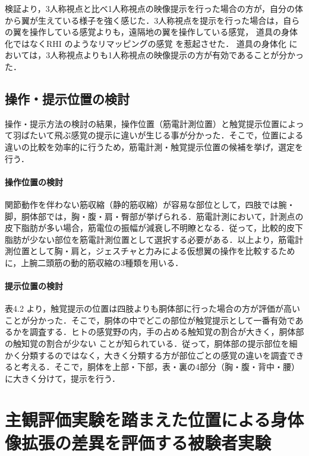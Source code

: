 \begin{small}
      検証より，3人称視点と比べ1人称視点の映像提示を行った場合の方が，自分の体から翼が生えている様子を強く感じた．3人称視点を提示を行った場合は，自らの翼を操作している感覚よりも，遠隔地の翼を操作している感覚，
      道具の身体化ではなくRHI
      のようなリマッピングの感覚
      を惹起させた．
      道具の身体化
      においては，3人称視点よりも1人称視点の映像提示の方が有効であることが分かった．
  
  \subsection{操作・提示位置の検討}
    操作・提示方法の検討の結果，操作位置（筋電計測位置）と触覚提示位置によって羽ばたいて飛ぶ感覚の提示に違いが生じる事が分かった．そこで，位置による違いの比較を効率的に行うため，筋電計測・触覚提示位置の候補を挙げ，選定を行う．
  
    \paragraph{操作位置の検討} %
      関節動作を伴わない筋収縮（静的筋収縮）が容易な部位として，四肢では腕・脚，胴体部では，胸・腹・肩・臀部が挙げられる．筋電計測において，計測点の皮下脂肪が多い場合，筋電位の振幅が減衰し不明瞭となる\cite{白石恵1992筋電位多点計測による体幹背部の神経支配帯の分布}．従って，比較的皮下脂肪が少ない部位を筋電計測位置として選択する必要がある．以上より，筋電計測位置として胸・肩と，ジェスチャと力みによる仮想翼の操作を比較するために，上腕二頭筋の動的筋収縮の3種類を用いる．


    \paragraph{提示位置の検討} %
      表4.2
      より，触覚提示の位置は四肢よりも胴体部に行った場合の方が評価が高いことが分かった．そこで，胴体の中でどこの部位が触覚提示として一番有効であるかを調査する．ヒトの感覚野の内，手の占める触知覚の割合が大きく\cite{penfield1950cerebral}，胴体部の触知覚の割合が少ない
      ことが知られている．従って，胴体部の提示部位を細かく分類するのではなく，大きく分類する方が部位ごとの感覚の違いを調査できると考える．そこで，胴体を上部・下部，表・裏の4部分（胸・腹・背中・腰）に大きく分けて，提示を行う．        


\section{主観評価実験を踏まえた位置による身体像拡張の差異を評価する被験者実験}
        

\end{small}
